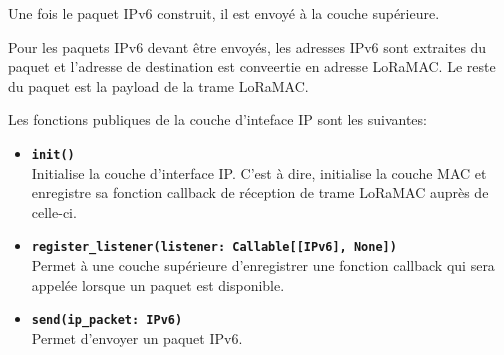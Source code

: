         Une fois le paquet IPv6 construit, il est envoyé à la couche supérieure.
        
        Pour les paquets IPv6 devant être envoyés, les adresses IPv6 sont extraites du paquet et l'adresse de destination est conveertie en adresse LoRaMAC. Le reste du paquet est la payload de la trame LoRaMAC.

        Les fonctions publiques de la couche d'inteface IP sont les suivantes:
        \begin{itemize}
            \item \textbf{\texttt{init()}}\\Initialise la couche d'interface IP. C'est à dire, initialise la couche MAC et enregistre sa fonction callback de réception de trame LoRaMAC auprès de celle-ci.
            \item \textbf{\texttt{register\_listener(listener: Callable[[IPv6], None])}}\\
            Permet à une couche supérieure d'enregistrer une fonction callback qui sera appelée lorsque un paquet est disponible.
            \item \textbf{\texttt{send(ip\_packet: IPv6)}}\\
            Permet d'envoyer un paquet IPv6.
        \end{itemize}


